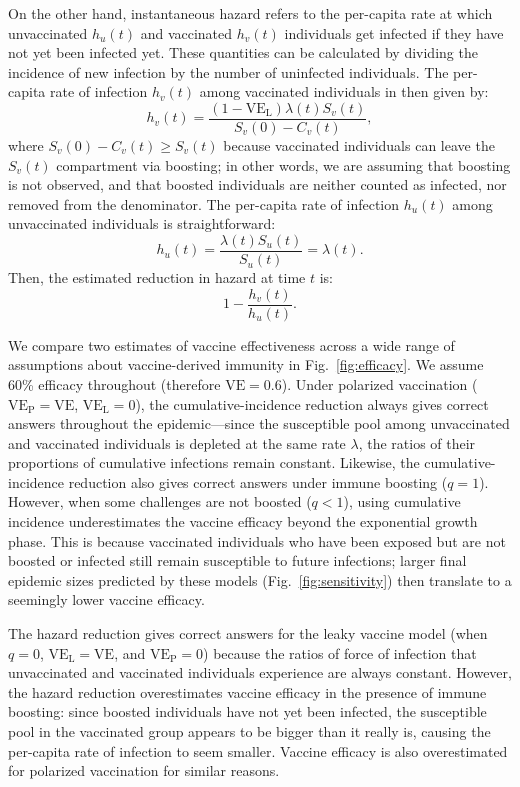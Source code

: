 \documentclass[12pt]{article}
\newcommand{\fref}[1]{Fig.~\ref{fig:#1}}
\newcommand{\VE}{\ensuremath{\mathrm{VE}}}
\newcommand{\VEP}{\ensuremath{\VE_{\mathrm{P}}}}
\newcommand{\VEL}{\ensuremath{\VE_{\mathrm{L}}}}
\begin{document}
On the other hand, instantaneous hazard refers to the per-capita rate at which unvaccinated $h_u(t)$ and vaccinated $h_v(t)$ individuals get infected if they have not yet been infected yet.
These quantities can be calculated by dividing the incidence of new infection by the number of uninfected individuals.
The per-capita rate of infection $h_v(t)$ among vaccinated individuals in then given by:
\begin{equation}
h_v(t) = \frac{(1-\VEL) \lambda(t) S_v(t)}{S_v(0) - C_v(t)},
\end{equation}
where $S_v(0) - C_v(t) \geq S_v(t)$ because vaccinated individuals can leave the $S_v(t)$ compartment via boosting;
in other words, we are assuming that boosting is not observed, and that boosted individuals are neither counted as infected, nor removed from the denominator.
The per-capita rate of infection $h_u(t)$ among unvaccinated individuals is straightforward: 
\begin{equation}
h_u(t) = \frac{\lambda(t) S_u(t)}{S_u(t)} = \lambda(t).
\end{equation}
Then, the estimated reduction in hazard at time $t$ is:
\begin{equation}
1 - \frac{h_v(t)}{h_u(t)}.
\end{equation}

We compare two estimates of vaccine effectiveness across a wide range of assumptions about vaccine-derived immunity in \fref{efficacy}.
We assume 60\% efficacy throughout (therefore $\VE = 0.6$).
Under polarized vaccination ($\VEP=\VE$, $\VEL=0$), the cumulative-incidence reduction always gives correct answers throughout the epidemic---since the susceptible pool among unvaccinated and vaccinated individuals is depleted at the same rate $\lambda$, the ratios of their proportions of cumulative infections remain constant.
Likewise, the cumulative-incidence reduction also gives correct answers under immune boosting ($q=1$).
However, when some challenges are not boosted ($q < 1$), using cumulative incidence underestimates the vaccine efficacy beyond the exponential growth phase.
This is because vaccinated individuals who have been exposed but are not boosted or infected still remain susceptible to future infections; 
larger final epidemic sizes predicted by these models (\fref{sensitivity}) then translate to a seemingly lower vaccine efficacy.

The hazard reduction gives correct answers for the leaky vaccine model (when $q=0$, $\VEL = \VE$, and $\VEP = 0$) because the ratios of force of infection that unvaccinated and vaccinated individuals experience are always constant.
However, the hazard reduction overestimates vaccine efficacy in the presence of immune boosting: since boosted individuals have not yet been infected, the susceptible pool in the vaccinated group appears to be bigger than it really is, causing the per-capita rate of infection to seem smaller.
Vaccine efficacy is also overestimated for polarized vaccination for similar reasons.
\end{document}

